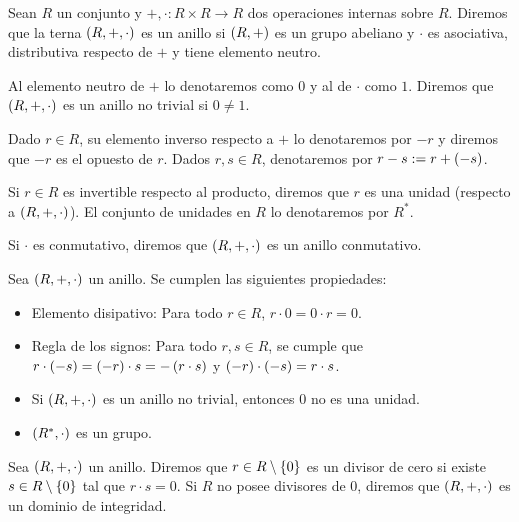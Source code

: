 \begin{definition}
  \rm Sean $R$ un conjunto y $+,\cdot:R\times R\rightarrow R$ dos operaciones internas sobre $R$. Diremos que la terna $\left(R,+,\cdot\right)$ es un anillo si $\left(R,+\right)$ es un grupo abeliano y $\cdot$ es asociativa, distributiva respecto de $+$ y tiene elemento neutro. 
  
  Al elemento neutro de $+$ lo denotaremos como $0$ y al de $\cdot$ como $1$. Diremos que $\left(R,+,\cdot\right)$ es un anillo no trivial si $0\neq 1$.
  
  Dado $r\in R$, su elemento inverso respecto a $+$ lo denotaremos por $-r$ y diremos que $-r$ es el opuesto de $r$. Dados $r,s\in R$, denotaremos por $r-s:=r+\left(-s\right)$.
  
  Si $r\in R$ es invertible respecto al producto, diremos que $r$ es una unidad (respecto a $\left(R,+,\cdot\right)$). El conjunto de unidades en $R$ lo denotaremos por $R^*$.

  Si $\cdot$ es conmutativo, diremos que $\left(R,+,\cdot\right)$ es un anillo conmutativo. 
\end{definition}

\begin{proposition}
  \rm Sea $\left(R,+,\cdot\right)$ un anillo. Se cumplen las siguientes propiedades:

  \begin{itemize}
    \item Elemento disipativo: Para todo $r\in R$, $r\cdot 0=0\cdot r=0$.
    \item Regla de los signos: Para todo $r,s\in R$, se cumple que $r\cdot\left(-s\right)=\left(-r\right)\cdot s=-\left(r\cdot s\right)$ y $\left(-r\right)\cdot\left(-s\right)=r\cdot s$.
    \item Si $\left(R,+,\cdot\right)$ es un anillo no trivial, entonces $0$ no es una unidad.
    \item $\left(R^*,\cdot\right)$ es un grupo.
  \end{itemize}
\end{proposition}

\begin{definition}
  \rm Sea $\left(R,+,\cdot\right)$ un anillo. Diremos que $r\in R\setminus\left\{0\right\}$ es un divisor de cero si existe $s\in R\setminus\left\{0\right\}$ tal que $r\cdot s=0$. Si $R$ no posee divisores de $0$, diremos que $\left(R,+,\cdot\right)$ es un dominio de integridad.
\end{definition}

